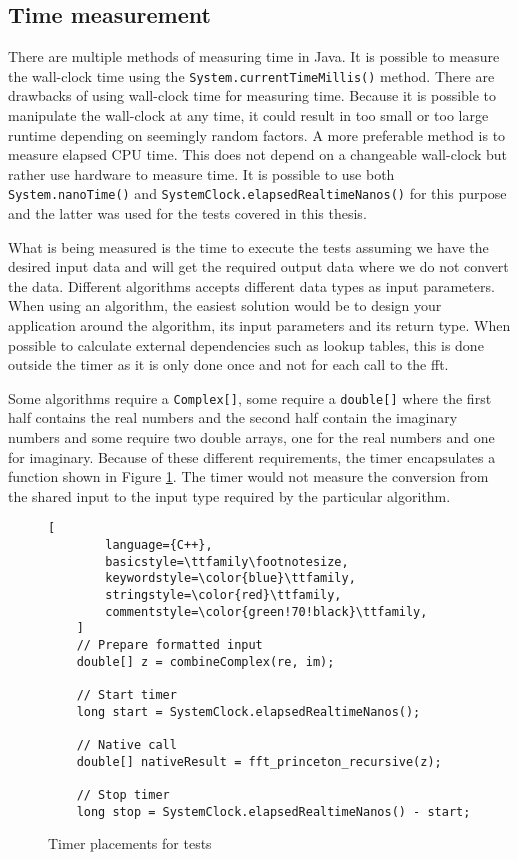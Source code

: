 \subsection{Time measurement}
There are multiple methods of measuring time in Java. It is possible to measure the wall-clock time using the \texttt{System.currentTimeMillis()} method. There are drawbacks of using wall-clock time for measuring time. Because it is possible to manipulate the wall-clock at any time, it could result in too small or too large runtime depending on seemingly random factors. A more preferable method is to measure elapsed CPU time. This does not depend on a changeable wall-clock but rather use hardware to measure time. It is possible to use both \texttt{System.nanoTime()} and \texttt{SystemClock.elapsedRealtimeNanos()} for this purpose and the latter was used for the tests covered in this thesis.

What is being measured is the time to execute the tests assuming we have the desired input data and will get the required output data where we do not convert the data. Different algorithms accepts different data types as input parameters. When using an algorithm, the easiest solution would be to design your application around the algorithm, its input parameters and its return type. When possible to calculate external dependencies such as lookup tables, this is done outside the timer as it is only done once and not for each call to the \gls{fft}.

Some algorithms require a \texttt{Complex[]}, some require a \texttt{double[]} where the first half contains the real numbers and the second half contain the imaginary numbers and some require two double arrays, one for the real numbers and one for imaginary. Because of these different requirements, the timer encapsulates a function shown in Figure \ref{fig:timer:pos}. The timer would not measure the conversion from the shared input to the input type required by the particular algorithm.

\begin{figure}
\begin{lstlisting}[
        language={C++},
        basicstyle=\ttfamily\footnotesize,
        keywordstyle=\color{blue}\ttfamily,
        stringstyle=\color{red}\ttfamily,
        commentstyle=\color{green!70!black}\ttfamily,
    ]
    // Prepare formatted input
    double[] z = combineComplex(re, im);

    // Start timer
    long start = SystemClock.elapsedRealtimeNanos();

    // Native call
    double[] nativeResult = fft_princeton_recursive(z);

    // Stop timer
    long stop = SystemClock.elapsedRealtimeNanos() - start;
\end{lstlisting}
\caption{Timer placements for tests}
\label{fig:timer:pos}
\end{figure}

